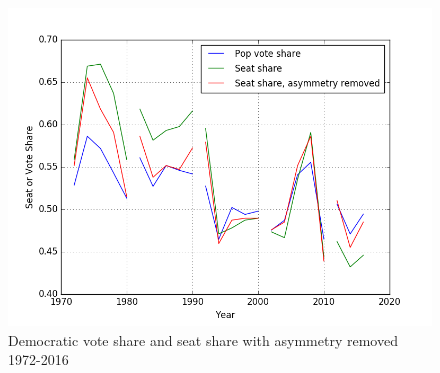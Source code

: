 \documentclass[preprint,12pt]{article}
\begin{document}
\begin{figure}[htb!]
    \begin{center}
        \includegraphics[scale=0.8]{../Figures/HistoricAsymmetry/sv.png}
        \caption{Democratic vote share and seat share with asymmetry removed 1972-2016}\label{fig:AsymRemoved}
    \end{center}
\end{figure}
\end{document}
